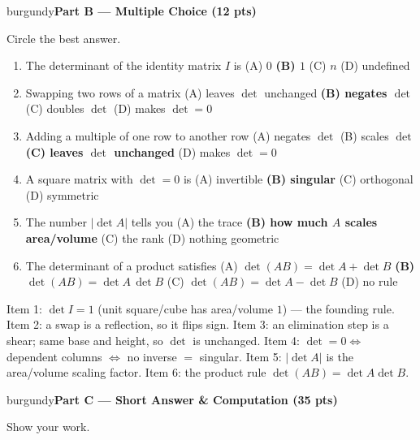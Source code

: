 \documentclass[10pt]{article}
\newcommand{\parthead}[1]{%
  \vspace{6pt}\noindent
  \begin{headlinebox}{burgundy}{\color{white}\bfseries #1}\end{headlinebox}%
  \vspace{4pt}}
\begin{document}
\parthead{Part B --- Multiple Choice (12 pts)}
Circle the best answer.

\begin{enumerate}[leftmargin=1.9em, itemsep=9pt]
  \item The determinant of the identity matrix $I$ is
    \hfill (A) $0$ \quad \textbf{(B) $1$} \ans{$\leftarrow$} \quad (C) $n$ \quad (D) undefined
  \item Swapping two rows of a matrix
    \hfill (A) leaves $\det$ unchanged \quad \textbf{(B) negates $\det$} \ans{$\leftarrow$} \quad (C) doubles $\det$ \quad (D) makes $\det=0$
  \item Adding a multiple of one row to another row
    \hfill (A) negates $\det$ \quad (B) scales $\det$ \quad \textbf{(C) leaves $\det$ unchanged} \ans{$\leftarrow$} \quad (D) makes $\det=0$
  \item A square matrix with $\det=0$ is
    \hfill (A) invertible \quad \textbf{(B) singular} \ans{$\leftarrow$} \quad (C) orthogonal \quad (D) symmetric
  \item The number $|\det A|$ tells you
    \hfill (A) the trace \quad \textbf{(B) how much $A$ scales area/volume} \ans{$\leftarrow$} \quad (C) the rank \quad (D) nothing geometric
  \item The determinant of a product satisfies
    \hfill (A) $\det(AB)=\det A+\det B$ \quad \textbf{(B) $\det(AB)=\det A\,\det B$} \ans{$\leftarrow$} \quad (C) $\det(AB)=\det A-\det B$ \quad (D) no rule
\end{enumerate}

\begin{teachernote}
Item 1: $\det I=1$ (unit square/cube has area/volume $1$) --- the founding rule. Item 2: a swap is a
reflection, so it flips sign. Item 3: an elimination step is a shear; same base and height, so $\det$ is
unchanged. Item 4: $\det=0\Leftrightarrow$ dependent columns $\Leftrightarrow$ no inverse $=$ singular.
Item 5: $|\det A|$ is the area/volume scaling factor. Item 6: the product rule $\det(AB)=\det A\det B$.
\end{teachernote}

\parthead{Part C --- Short Answer \& Computation (35 pts)}
Show your work.
\end{document}
